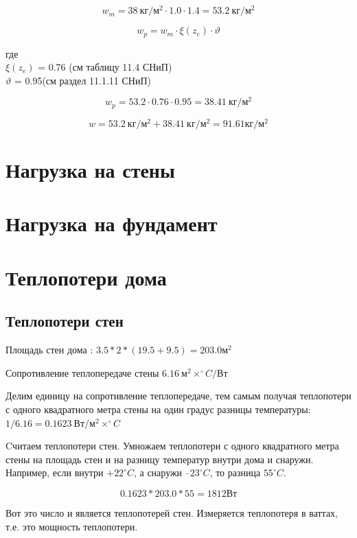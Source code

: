 \documentclass[10pt, twocolumn]{report}
\begin{document}
$$w_m = 38\ \text{кг}/\text{м}^2 \cdot 1.0 \cdot 1.4 = 53.2\ \text{кг}/\text{м}^2$$

$$w_p = w_m \cdot \xi(z_e) \cdot \vartheta$$

где \\
\noindent
$\xi(z_e)$ = 0.76 (см таблицу 11.4 СНиП) \\
$\vartheta$ = 0.95(см раздел 11.1.11 СНиП) 

$$w_p = 53.2 \cdot 0.76 \cdot 0.95 = 38.41\ \text{кг}/\text{м}^2$$


$$w = 53.2\ \text{кг}/\text{м}^2 + 38.41\ \text{кг}/\text{м}^2 = 91.61 \text{кг}/\text{м}^2 $$


\chapter{Нагрузка на стены}

\chapter{Нагрузка на фундамент}

\chapter{Теплопотери дома}

\section{Теплопотери стен}

Площадь стен дома : $3.5 * 2 * (19.5 + 9.5) = 203.0 \text{м}^2$

\noindent Сопротивление теплопередаче стены $6.16\ \text{м}^2\times ^{\circ}C / \text{Вт} $ 

\noindent Делим единицу на сопротивление теплопередаче, тем самым получая теплопотери с одного квадратного метра стены на один градус разницы температуры: 
$1 / 6.16 = 0.1623\ \text{Вт} / \text{м}^2\times ^{\circ}C$

\noindent Cчитаем теплопотери стен. Умножаем теплопотери с одного квадратного метра стены на площадь стен и на разницу температур внутри дома и снаружи. Например, если внутри $+22^{\circ}C$, а снаружи $–23^{\circ}C$, то разница $55^{\circ}C$.

$$ 0.1623 * 203.0 * 55 = 1812 \text{Вт} $$

Вот это число и является теплопотерей стен. Измеряется теплопотеря в ваттах, т.е. это мощность теплопотери.
\end{document}
